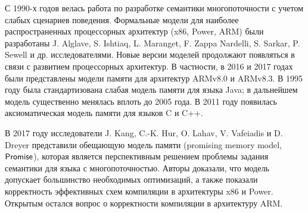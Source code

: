 
{\progress}
С 1990-х годов велась работа по
разработке семантики многопоточности с учетом слабых сценариев поведения.
Формальные модели для наиболее распространенных процессорных архитектур (x86, Power, ARM)
были разработаны J. Alglave, S. Ishtiaq, L. Maranget, F. Zappa Nardelli, S. Sarkar, P. Sewell и др.
исследователями.
Новые версии моделей продолжают появляться в связи с развитием процессорных архитектур.
В частности, в 2016 и 2017 годах были представлены модели памяти для архитектур ARMv8.0 и
ARMv8.3.
В 1995 году была стандартизована слабая модель памяти для языка Java;
в дальнейшем модель существенно менялась вплоть до 2005 года.
В 2011 году появилась аксиоматическая модель памяти для языков C и C++.

В 2017 году исследователи J. Kang, C.-K. Hur, O. Lahav, V. Vafeiadis и D. Dreyer
представили обещающую модель памяти (promising memory model, $\mathsf{Promise}$), которая является перспективным
решением проблемы задания семантики для языка с многопоточностью. Авторы 
доказали, что модель допускает большинство необходимых оптимизаций, а также показали корректность
эффективных схем компиляции в архитектуры x86 и Power. Открытым остался вопрос о корректности компиляции
в архитектуру ARM.


